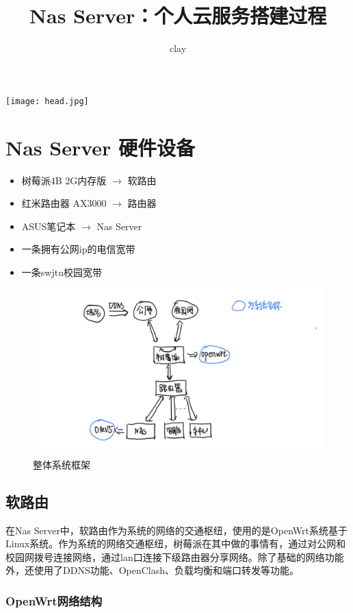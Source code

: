 \documentclass[cn,hazy,blue,10.5pt,normal]{elegantnote}
\title{Nas Server：个人云服务搭建过程}
\author{clay}
\institute{\LaTeX{} Program}
\date{\zhtoday}
\begin{document}
\maketitle

\centerline{
  \texttt{[image: head.jpg]}
}

\newpage
\section{Nas Server 硬件设备}

\begin{itemize}
  \item 树莓派4B 2G内存版 $\rightarrow$ 软路由
  \item 红米路由器 AX3000 $\rightarrow$ 路由器
  \item ASUS笔记本 $\rightarrow$ Nas Server
  \item 一条拥有公网ip的电信宽带
  \item 一条swjtu校园宽带
\end{itemize}

\begin{figure}[!htb]
  \centering
  \includegraphics[scale=0.25]{image/系统架构.PNG}
  \caption{整体系统框架}
\end{figure}

\subsection{软路由}

在Nas Server中，软路由作为系统的网络的交通枢纽，使用的是OpenWrt系统基于Linux系统。作为系统的网络交通枢纽，树莓派在其中做的事情有，通过对公网和校园网拨号连接网络，通过lan口连接下级路由器分享网络。除了基础的网络功能外，还使用了DDNS功能、OpenClash、负载均衡和端口转发等功能。

\subsubsection{OpenWrt网络结构}
\end{document}

